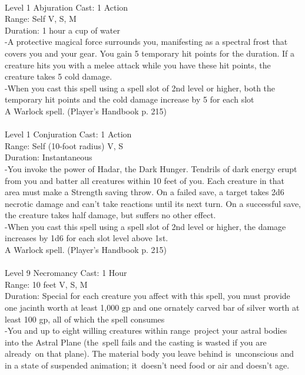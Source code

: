 \documentclass[10pt,twocolumn]{report}
\begin{document}
 \\
Level 1 \quad Abjuration \quad Cast: 1 Action\\
Range: Self \quad V, S, M\\
Duration: 1 hour \quad a cup of water\\
-A protective magical force surrounds you, manifesting as a spectral frost that covers you and your gear. 
You gain 5 temporary hit points for the duration. If a creature hits you with a melee attack while you have these hit points, the creature takes 5 cold damage.\\
-When you cast this spell using a spell slot of 2nd level or higher, both the temporary hit points and the cold damage increase by 5 for each slot\\
A Warlock spell. (Player's Handbook p. 215) \\


 \\
Level 1 \quad Conjuration \quad Cast: 1 Action\\
Range: Self (10-foot radius) \quad V, S\\
Duration: Instantaneous \quad \\
-You invoke the power of Hadar, the Dark Hunger. 
Tendrils of dark energy erupt from you and batter all creatures within 10 feet of you. Each creature in that area must make a Strength saving throw. On a failed save, a target takes 2d6 necrotic damage and can’t take reactions until its next turn. On a successful save, the creature takes half damage, but suffers no other effect.\\
-When you cast this spell using a spell slot of 2nd level or higher, the damage increases by 1d6 for each slot level above 1st.\\
A Warlock spell. (Player's Handbook p. 215) \\


 \\
Level 9 \quad Necromancy \quad Cast: 1 Hour\\
Range: 10 feet \quad V, S, M\\
Duration: Special \quad for each creature you affect with this spell, you must provide one jacinth worth at least 1,000 gp and one ornately carved bar of silver worth at least 100 gp, all of which the spell consumes\\
-You and up to eight willing creatures within range project your astral bodies into the Astral Plane (the spell fails and the casting is wasted if you are already on that plane). 
The material body you leave behind is unconscious and in a state of suspended animation; it doesn’t need food or air and doesn’t age. 
\end{document}
